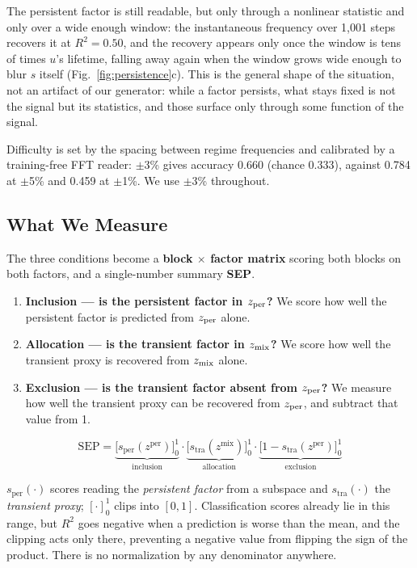 The persistent factor is still readable, but only through a nonlinear statistic and only over a wide enough window: the instantaneous frequency over 1,001 steps recovers it at $R^2=0.50$, and the recovery appears only once the window is tens of times $u$'s lifetime, falling away again when the window grows wide enough to blur $s$ itself (Fig.~\ref{fig:persistence}c). This is the general shape of the situation, not an artifact of our generator: while a factor persists, what stays fixed is not the signal but its statistics, and those surface only through some function of the signal.

Difficulty is set by the spacing between regime frequencies and calibrated by a training-free FFT reader: $\pm$3\% gives accuracy 0.660 (chance 0.333), against 0.784 at $\pm$5\% and 0.459 at $\pm$1\%. We use $\pm$3\% throughout.

\subsection{What We Measure}
\label{sec:measure}

The three conditions become a \textbf{block $\times$ factor matrix} scoring both blocks on both factors, and a single-number summary \textbf{SEP}.

\begin{enumerate}
\item \textbf{Inclusion --- is the persistent factor in $z_{\mathrm{per}}$?} We score how well the persistent factor is predicted from $z_{\mathrm{per}}$ alone.
\item \textbf{Allocation --- is the transient factor in $z_{\mathrm{mix}}$?} We score how well the transient proxy is recovered from $z_{\mathrm{mix}}$ alone.
\item \textbf{Exclusion --- is the transient factor absent from $z_{\mathrm{per}}$?} We measure how well the transient proxy can be recovered from $z_{\mathrm{per}}$, and subtract that value from 1.
\end{enumerate}

\begin{equation}
\mathrm{SEP} = \underbrace{\big[s_{\text{per}}(z^{\mathrm{per}})\big]_0^1}_{\text{inclusion}} \cdot \underbrace{\big[s_{\text{tra}}(z^{\mathrm{mix}})\big]_0^1}_{\text{allocation}} \cdot \underbrace{\big[1-s_{\text{tra}}(z^{\mathrm{per}})\big]_0^1}_{\text{exclusion}}
\label{eq:sep}
\end{equation}

$s_{\text{per}}(\cdot)$ scores reading the \emph{persistent factor} from a subspace and $s_{\text{tra}}(\cdot)$ the \emph{transient proxy}; $[\cdot]_0^1$ clips into $[0,1]$. Classification scores already lie in this range, but $R^2$ goes negative when a prediction is worse than the mean, and the clipping acts only there, preventing a negative value from flipping the sign of the product. There is no normalization by any denominator anywhere.
